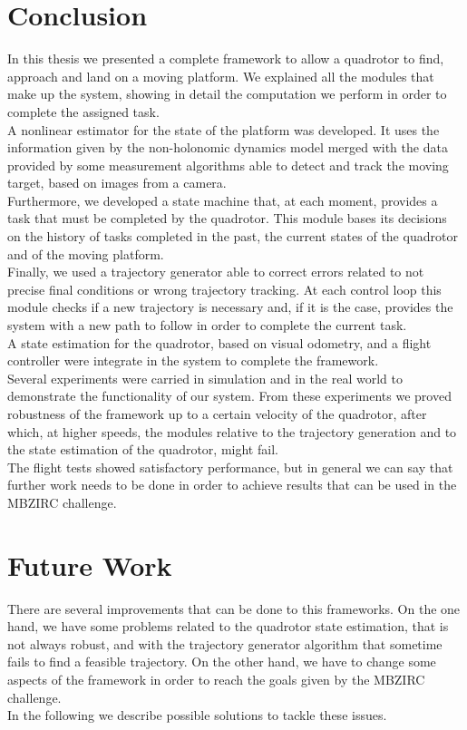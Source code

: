 \section{Conclusion}\label{sec:conclusion}
In this thesis we presented a complete framework to allow a quadrotor to find, approach and land on a moving platform. We explained all the modules that make up the system, showing in detail the computation we perform in order to complete the assigned task. \\
A nonlinear estimator for the state of the platform was developed. It uses the information given by the non-holonomic dynamics model merged with the data provided by some measurement algorithms able to detect and track the moving target, based on images from a camera.\\
Furthermore, we developed a state machine that, at each moment, provides a task that must be completed by the quadrotor. This module bases its decisions on the history of tasks completed in the past, the current states of the quadrotor and of the moving platform.\\
Finally, we used a trajectory generator able to correct errors related to not precise final conditions or wrong trajectory tracking. At each control loop this module checks if a new trajectory is necessary and, if it is the case, provides the system with a new path to follow in order to complete the current task.\\
A  state estimation for the quadrotor, based on visual odometry, and a flight controller were integrate in the system to complete the framework.\\

Several experiments were carried in simulation and in the real world to demonstrate the functionality of our system. From these experiments we proved robustness of the framework up to a certain velocity of the quadrotor, after which, at higher speeds, the modules relative to the trajectory generation and to the state estimation of the quadrotor, might fail.\\
The flight tests showed satisfactory performance, but in general we can say that further work needs to be done in order to achieve results that can be used in the MBZIRC challenge.

\section{Future Work}\label{sec:future_work}
There are several improvements that can be done to this frameworks. On the one hand, we have some problems related to the quadrotor state estimation, that is not always robust, and with the trajectory generator algorithm that sometime fails to find a feasible trajectory. On the other hand, we have to change some aspects of the framework in order to reach the goals given by the MBZIRC challenge.\\
In the following we describe possible solutions to tackle these issues.

